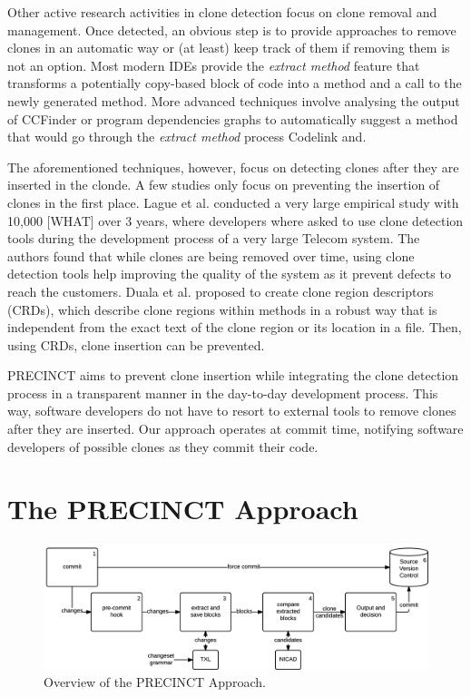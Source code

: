 \documentclass[conference]{IEEEtran}
\begin{document}
Other active research activities in clone detection focus on clone removal and management. Once detected, an obvious step is to provide approaches to remove clones in an automatic way or (at least) keep track of them if removing them is not an option.
Most modern IDEs provide the \textit{extract method} feature that transforms a potentially copy-based block of code into a method and a call to the newly generated method\cite{Komondoor,higo2004refactoring}.
More advanced techniques involve analysing the output of CCFinder\cite{Bomarius2004} or program dependencies graphs\cite{higo2004refactoring} to automatically suggest a method that would go through the \textit{extract method} process
Codelink\cite{Toomim} and\cite{Duala-Ekoko2007}.

The aforementioned  techniques, however, focus on detecting clones after they are inserted in the clonde. A few studies only focus on preventing the insertion of clones in the first place. Lague et al. \cite{Lague} conducted a very large empirical study with 10,000 [WHAT] over 3 years, where developers where asked to use clone detection tools during the development process of a very large Telecom system. The authors found that while clones are being removed over time, using clone detection tools help improving the quality of the system as it prevent defects to reach the customers. Duala et al. \cite{Duala-Ekoko2007,Duala-Ekoko2010} proposed to create clone region descriptors (CRDs), which describe clone regions within methods in a robust way that is independent from the exact text of the clone region or its location in a file. Then, using CRDs, clone insertion can be prevented.

PRECINCT aims to prevent clone insertion while integrating the clone detection process in a transparent manner in the day-to-day development process. This way, software developers do not have to resort to external tools to remove clones after they are inserted. Our approach operates at commit time, notifying software developers of possible clones as they commit their code. 


\section{The PRECINCT Approach}
\label{sec:The PRECINCT Approach}

\begin{figure}
  \centering
    \includegraphics[width=\textwidth]{media/approach.png}
    \caption{ Overview of the PRECINCT Approach.\label{fig:precinct-approach}}
\end{figure}
\end{document}
